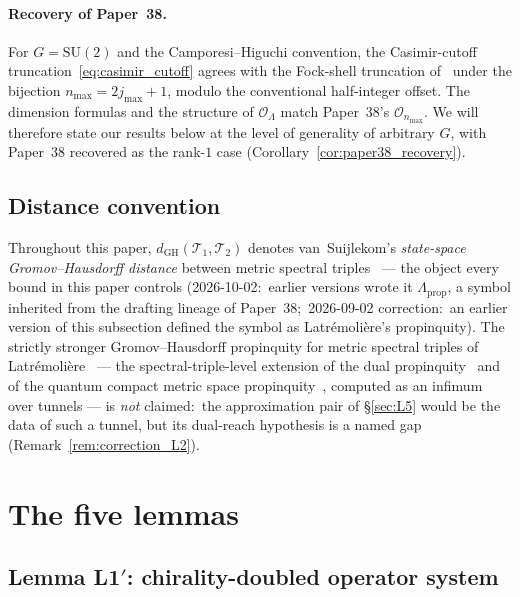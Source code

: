 \documentclass[11pt,a4paper]{article}
\theoremstyle{plain}
\theoremstyle{definition}
\newcommand{\Lammax}{\Lambda}
\newcommand{\Op}{\mathcal{O}}
\newcommand{\Tcal}{\mathcal{T}}
\newcommand{\SU}{\mathrm{SU}}
\begin{document}
\paragraph{Recovery of Paper~38.}
For $G = \SU(2)$ and the Camporesi--Higuchi convention, the
Casimir-cutoff truncation~\eqref{eq:casimir_cutoff} agrees with the
Fock-shell truncation of~\cite{paper38} under the bijection
$n_{\mathrm{max}} = 2j_{\mathrm{max}} + 1$, modulo the conventional
half-integer offset. The dimension formulas and the structure of
$\Op_\Lammax$ match Paper~38's $\Op_{n_{\max}}$. We will therefore
state our results below at the level of generality of arbitrary
$G$, with Paper~38 recovered as the rank-$1$ case
(Corollary~\ref{cor:paper38_recovery}).

\subsection{Distance convention}\label{sec:propinquity_convention}

Throughout this paper, $d_{\mathrm{GH}}(\Tcal_1, \Tcal_2)$
denotes van~Suijlekom's \emph{state-space Gromov--Hausdorff distance}
between metric spectral triples~\cite{vs2021_jgp} --- the object every
bound in this paper controls (2026-10-02:\ earlier versions wrote it
$\Lambda_{\mathrm{prop}}$, a symbol inherited from the drafting lineage
of Paper~38;\ 2026-09-02 correction:\ an earlier version of this
subsection defined the symbol as Latr\'emoli\`ere's propinquity). The
strictly stronger Gromov--Hausdorff propinquity for metric spectral
triples of Latr\'emoli\`ere~\cite{latremoliere_metric_st_2017} --- the
spectral-triple-level extension of the dual
propinquity~\cite{latremoliere2016} and of the quantum compact metric
space propinquity~\cite{latremoliere2018}, computed as an infimum over
tunnels --- is \emph{not} claimed:\ the approximation pair of
\S\ref{sec:L5} would be the data of such a tunnel, but its dual-reach
hypothesis is a named gap (Remark~\ref{rem:correction_L2}).

\section{The five lemmas}\label{sec:lemmas}

\subsection{Lemma L1$'$: chirality-doubled operator system}\label{sec:L1prime}
\end{document}
